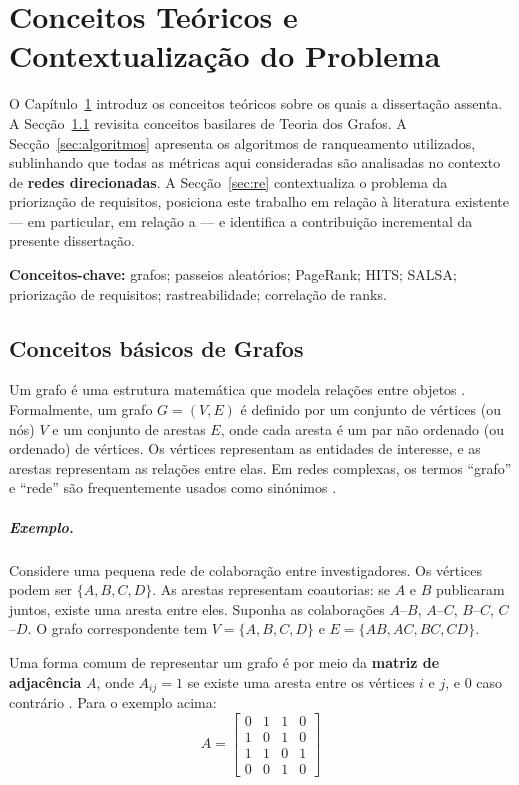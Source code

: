 \chapter{Conceitos Teóricos e Contextualização do Problema}
\label{ch:fundamentos}

O Capítulo~\ref{ch:fundamentos} introduz os conceitos teóricos sobre
os quais a dissertação assenta. A Secção~\ref{sec:grafos} revisita
conceitos basilares de Teoria dos Grafos. A Secção~\ref{sec:algoritmos}
apresenta os algoritmos de ranqueamento utilizados, sublinhando que
todas as métricas aqui consideradas são analisadas no contexto de
\textbf{redes direcionadas}. A Secção~\ref{sec:re} contextualiza o
problema da priorização de requisitos, posiciona este trabalho em
relação à literatura existente --- em particular, em relação a
\citet{silva2018} --- e identifica a contribuição incremental da
presente dissertação.

\noindent\textbf{Conceitos-chave:} grafos; passeios aleatórios;
PageRank; HITS; SALSA; priorização de requisitos; rastreabilidade;
correlação de ranks.

\section{Conceitos básicos de Grafos}
\label{sec:grafos}

Um grafo é uma estrutura matemática que modela relações entre objetos
\parencite{newman2010, szwarcfiter2018}. Formalmente, um grafo
$G = (V,E)$ é definido por um conjunto de vértices (ou nós) $V$ e um
conjunto de arestas $E$, onde cada aresta é um par não ordenado (ou
ordenado) de vértices. Os vértices representam as entidades de
interesse, e as arestas representam as relações entre elas. Em redes
complexas, os termos ``grafo'' e ``rede'' são frequentemente usados
como sinónimos \parencite{newman2010}.

\paragraph{Exemplo.} Considere uma pequena rede de colaboração entre
investigadores. Os vértices podem ser $\{A,B,C,D\}$. As arestas
representam coautorias: se $A$ e $B$ publicaram juntos, existe uma
aresta entre eles. Suponha as colaborações $A$--$B$, $A$--$C$,
$B$--$C$, $C$--$D$. O grafo correspondente tem $V = \{A,B,C,D\}$ e
$E = \{AB,AC,BC,CD\}$.

Uma forma comum de representar um grafo é por meio da \textbf{matriz
de adjacência} $A$, onde $A_{ij} = 1$ se existe uma aresta entre os
vértices $i$ e $j$, e $0$ caso contrário \parencite{newman2010}. Para
o exemplo acima:
\[
A = \begin{bmatrix}
0 & 1 & 1 & 0 \\
1 & 0 & 1 & 0 \\
1 & 1 & 0 & 1 \\
0 & 0 & 1 & 0
\end{bmatrix}
\]

